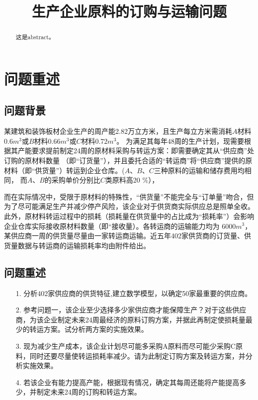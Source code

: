 \documentclass{cumcmthesis}
\title{生产企业原料的订购与运输问题}\tihao{A}
\begin{document}
\maketitle

\begin{abstract}
    这是abstract。

\end{abstract}

\section{问题重述}
\subsection{问题背景}
某建筑和装饰板材企业生产的周产能2.82万立方米，且生产每立方米需消耗$A$材料0.6$m^{3}$或$B$材料0.66$m^{3}$或$C$材料0.72$m^{3}$。
为满足其每年48周的生产计划，现需要根据其产能要求提前制定24周的原材料采购与转运方案：即需要确定其从“供应商”处订购的原材料数量
（即“订货量”），并且委托合适的“转运商”将“供应商”提供的原材料（即“供货量”）转运到企业仓库。($A$、$B$、$C$三种原料的运输和储存费用均相同，
而$A$、$B$的采购单价分别比$C$类原料高20 $\%$），\par
而在实际情况中，受限于原材料的特殊性，“供货量”不能完全与“订单量”吻合，但为了尽可能满足生产并减少停产风险，该企业对于供货商实际供应总是照单全收。
此外，原材料转运过程中的损耗（损耗量在供货量中的占比成为“损耗率”）会影响企业仓库实际接收原材料数量（即“接收量）。各转运商的运输能力均为
6000$m^{3}$，某供应商一周的供货量尽量由一家转运商运输。近五年402家供货商的订货量、供货量数据与转运商的运输损耗率均由附件给出。\par
\subsection{问题重述}
\begin{enumerate}
    \item [1.] 分析402家供应商的供货特征,建立数学模型，以确定50家最重要的供应商。
    \item [2.] 参考问题一，该企业至少选择多少家供应商才能保障生产？对于这些供应商，为该企业制定未来24周最经济的原料订购方案，并据此再制定使损耗量最少的转运方案。试分析两方案的实施效果。
    \item [3.] 现为减少生产成本，该企业计划尽可能多采购A原料而尽可能少采购C原料，同时还要尽量使转运损耗率减少。请为此制定订购方案及转运方案，并分析实施效果。
    \item [4.] 若该企业有能力提高产能，根据现有情况，确定其每周还能将产能提高多少，并制定未来24周的订购和转运方案。
\end{enumerate}
\end{document}
